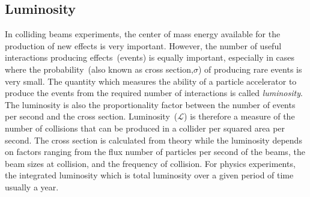 \subsection{Luminosity}
In colliding beams experiments, the center of mass energy available for the production of new effects is very important.
However, the number of useful interactions producing effects~(events) is equally important, especially
in cases where the probability~(also known as cross section,$\sigma$) of producing rare events is very small.
The quantity which measures the ability of a particle accelerator to produce the events from the required number of 
interactions is called \textit{luminosity}. The luminosity is also the proportionality factor between
the number of events per second and the cross section. Luminosity~($\mathscr{L}$) is therefore a measure of the number of collisions that can be produced in a collider per squared area per second. 
The cross section is calculated from theory while the luminosity depends on factors ranging from
the flux \ie number of particles per second  of the beams, the beam sizes at collision, and the frequency of collision.
For physics experiments, the integrated luminosity which is total luminosity over a given period of time
usually a year. 


